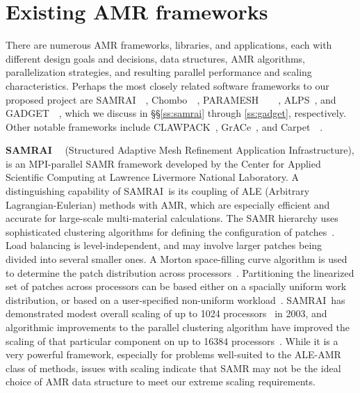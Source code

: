 \documentclass[11pt,letterpaper]{article}
\newcommand{\chombo}{\textsf{Chombo}}
\newcommand{\samrai}{\textsf{SAMRAI}}
\newcommand{\paramesh}{\textsf{PARAMESH}}
\newcommand{\gadget}{\textsf{GADGET}}
\newcommand{\alps}{\textsf{ALPS}}
\newcommand{\clawpack}{\textsf{CLAWPACK}}
\newcommand{\grace}{\textsf{GrACe}}
\newcommand{\carpet}{\textsf{Carpet}}
\begin{document}
\section{Existing AMR frameworks} \label{s:review}

There are numerous AMR frameworks, libraries, and applications, each
with different design goals and decisions, data structures, AMR
algorithms, parallelization strategies, and resulting parallel
performance and scaling characteristics.  Perhaps the most closely
related software frameworks to our proposed project are
\samrai~\cite{WiHo01}~\cite{wwwsamraicode},
\chombo~\cite{wwwchombo}~\cite{CoGr09},
\paramesh~\cite{MaOl00}~\cite{OlMa05}~\cite{Ol06}~\cite{wwwparamesh},
\alps~\cite{BuBu09}, and \gadget~\cite{wwwgadget}~\cite{Sp05}, which
we discuss in \S\S\ref{ss:samrai} through \ref{ss:gadget},
respectively.  Other notable frameworks include
\clawpack~\cite{wwwclawpack}, \grace~\cite{PaLi10}, and
\carpet~\cite{ScDi06}~\cite{wwwcarpet}.


\textbf{\samrai}~\cite{WiHo01}~\cite{wwwsamraicode} (Structured
Adaptive Mesh Refinement Application Infrastructure), is an
MPI-parallel SAMR framework developed by the Center for Applied
Scientific Computing at Lawrence Livermore National Laboratory.  A
distinguishing capability of \samrai\ is its coupling of ALE
(Arbitrary Lagrangian-Eulerian) methods with AMR, which are especially
efficient and accurate for large-scale multi-material calculations.
The SAMR hierarchy uses sophisticated clustering algorithms for
defining the configuration of patches~\cite{GuWi06}.  Load balancing
is level-independent, and may involve larger patches being divided
into several smaller ones.  A Morton space-filling curve algorithm is
used to determine the patch distribution across
processors~\cite{WiHo01}.  Partitioning the linearized set of patches
across processors can be based either on a spacially uniform work
distribution, or based on a user-specified non-uniform
workload~\cite{wwwsamraicode}.  \samrai\ has demonstrated modest
overall scaling of up to 1024 processors~\cite{WiHy03} in 2003, and
algorithmic improvements to the parallel clustering algorithm have
improved the scaling of that particular component on up to 16384
processors~\cite{GuWi06}.  While it is a very powerful framework,
especially for problems well-suited to the ALE-AMR class of methods,
issues with scaling indicate that SAMR may not be the ideal choice of
AMR data structure to meet our extreme scaling requirements.
\end{document}
